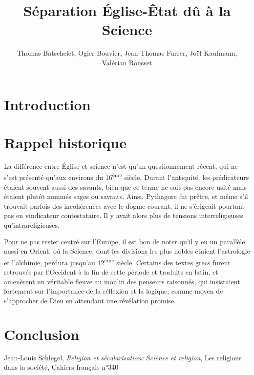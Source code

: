 \documentclass{article}
\title{S\'eparation \'Eglise-\^Etat d\^u \`a la Science}
\author{Thomas Batschelet, Ogier Bouvier, Jean-Thomas Furrer, Jo\"el Kaufmann, Val\'erian Rousset}
\begin{document}
\maketitle

\section{Introduction}

\section{Rappel historique}

La diff\'erence entre \'Eglise et science n'est qu'un questionnement r\'ecent, qui ne
s'est pr\'esent\'e qu'aux environs du 16\textsuperscript{\`eme} si\`ecle. Durant l'antiquit\'e, les pr\'edicateurs
\'etaient souvent aussi des savants, bien que ce terme ne soit pas encore usit\'e
mais \'etaient plutôt nomm\'es sages ou savants. Ainsi, Pythagore fut pr\^etre, et m\^eme
s'il trouvait parfois des incoh\'erences avec le dogme courant, il ne s'\'erigeait
pourtant pas en vindicateur contestataire. Il y avait alors plus de tensions
interreligieuses qu'intrareligieuses.

Pour ne pas rester centr\'e sur l'Europe, il est bon de noter qu'il y eu un
parall\`ele aussi en Orient, où la Science, dont les divisions les plus nobles
\'etaient l'astrologie et l'alchimie, perdura jusqu'au 12\textsuperscript{\`eme} si\`ecle.
Certains des textes grecs furent retrouv\'es par l'Occident \`a la fin de cette
p\'eriode et traduits en latin, et amen\`erent un v\'eritable fleuve au moulin des
penseurs raisonn\'es, qui insistaient fortement sur l'importance de la r\'eflexion
et la logique, comme moyen de s'approcher de Dieu en attendant une r\'ev\'elation
promise.

\section{Conclusion}

\begin{thebibliography}{9}

	Jean-Louis Schlegel,
	\emph{Religion et s\'ecularisation: Science et religion},
	Les religions dans la soci\'et\'e,
	Cahiers français n°340

\end{thebibliography}
\end{document}
